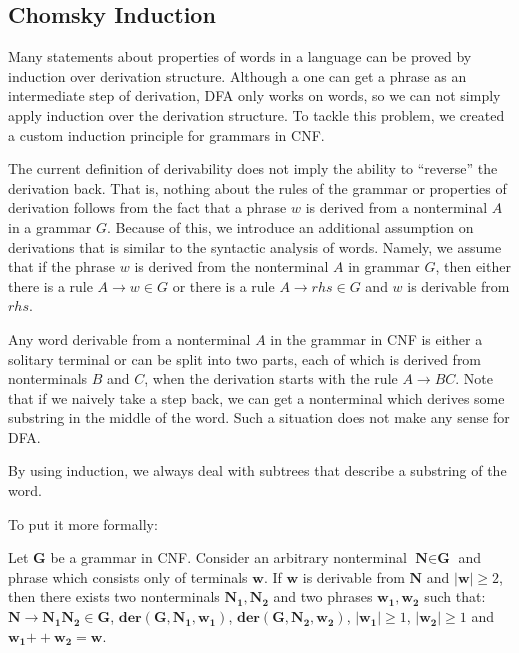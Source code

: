 \documentclass[runningheads]{llncs}
\begin{document}
\subsection{Chomsky Induction}
\label{sec:chomsky-induction}

Many statements about properties of words in a language can be proved by induction over derivation structure.
Although a one can get a phrase as an intermediate step of derivation, DFA only works on words, so we can not simply apply induction over the derivation structure. To tackle this problem, we created a custom induction principle for grammars in CNF.

The current definition of derivability does not imply the ability to ``reverse'' the derivation back. That is, nothing about the rules of the grammar or properties of derivation follows from the fact that a phrase $w$ is derived from a nonterminal $A$ in a grammar $G$. Because of this, we introduce an additional assumption on derivations that is similar to the syntactic analysis of words.
Namely, we assume that if the phrase $w$ is derived from the nonterminal $A$ in grammar $G$, then either there is a rule $A \to w \in G$ or there is a rule $A \to rhs \in G$ and $w$ is derivable from $rhs$.

Any word derivable from a nonterminal $A$ in the grammar in CNF is either a solitary terminal or can be split into two parts, each of which is derived from nonterminals $B$ and $C$, when the derivation starts with the rule $A \to B C$.
Note that if we naively take a step back, we can get a nonterminal which derives some substring in the middle of the word.
Such a situation does not make any sense for DFA.

By using induction, we always deal with subtrees that describe a substring of the word.

To put it more formally:
\begin{lemma} \label{lemma:chomskyind1}
Let $\textbf{G}$ be a grammar in CNF. Consider an arbitrary nonterminal $\textbf{N} \in \textbf{G}$ and phrase which consists only of terminals $\textbf{w}$.
If $\textbf{w}$ is derivable from $\boldsymbol{N}$ and $|\textbf{w}| \ge 2$, then there exists two nonterminals $\boldsymbol{N_1}, \boldsymbol{N_2}$ and two phrases $\boldsymbol{w_1, w_2}$ such that: $\boldsymbol{N \to N_1 N_2 \in G}$, $\boldsymbol{der(G, N_1, w_1)}$, $\boldsymbol{der(G, N_2, w_2)}$, $|\boldsymbol{w_1}| \ge 1$, $|\boldsymbol{w_2}| \ge 1$ and $\boldsymbol{w_1} \mathbin{++} \boldsymbol{w_2} = \textbf{w}$.
\end{lemma}
\end{document}
